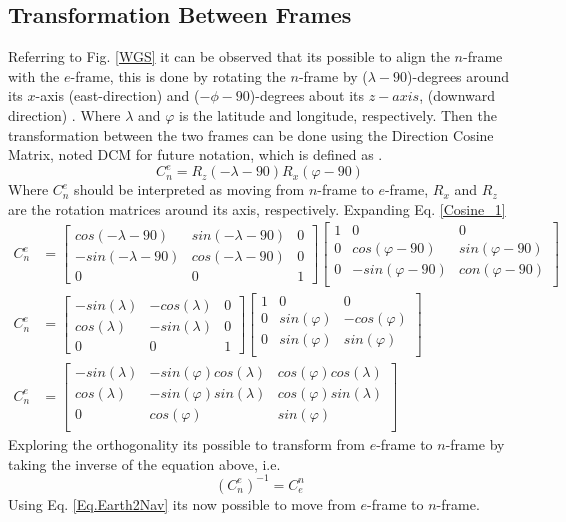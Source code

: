 \subsection*{Transformation Between Frames}
Referring to Fig. \ref{WGS} it can be observed that its possible to align the $n$-frame with the $e$-frame, this is done by rotating the $n$-frame by ($\lambda-90$)-degrees around its $x$-axis (east-direction) and ($-\phi-90$)-degrees about its $z-axis$, (downward direction) \cite{nonlinear}. Where $\lambda$ and $\varphi$ is the latitude and longitude, respectively. Then the transformation between the two frames can be done using the Direction Cosine Matrix, noted DCM for future notation, which is defined as \cite{nonlinear}.
\begin{equation}
C_n^e=R_z(-\lambda-90)R_x(\varphi-90)
\label{Cosine_1}
\end{equation}
Where $C_n^e$ should be interpreted as moving from $n$-frame to $e$-frame, $R_x$ and $R_z$ are the rotation matrices around its axis, respectively. Expanding Eq. \eqref{Cosine_1} 
\begin{align}
C_n^e &=
\begin{bmatrix}
cos(-\lambda-90) & sin(-\lambda-90) & 0\\
-sin(-\lambda-90) & cos(-\lambda-90) & 0\\
0 & 0 & 1
\end{bmatrix}
\begin{bmatrix}
1 & 0 & 0\\
0 & cos(\varphi-90) & sin(\varphi-90) \\
0 & -sin(\varphi-90) & con(\varphi-90) \\
\end{bmatrix}\\
C_n^e &=
\begin{bmatrix}
-sin(\lambda) & -cos(\lambda) & 0\\
cos(\lambda) & -sin(\lambda) & 0\\
0 & 0 & 1
\end{bmatrix}
\begin{bmatrix}
1 & 0 & 0\\
0 & sin(\varphi) & -cos(\varphi) \\
0 & sin(\varphi) & sin(\varphi) \\
\end{bmatrix}\\
C_n^e &=
\begin{bmatrix}
-sin(\lambda) & -sin(\varphi)cos(\lambda) & cos(\varphi)cos(\lambda) \\
cos(\lambda) & -sin(\varphi)sin(\lambda) &  cos(\varphi)sin(\lambda) \\
0 & cos(\varphi) & sin(\varphi) \\
\end{bmatrix}
\end{align}
Exploring the orthogonality its possible to transform from $e$-frame to $n$-frame by taking the inverse of the equation above, i.e.
\begin{equation}
(C_n^e)^{-1}=C_e^n
\label{Eq.Earth2Nav}
\end{equation}
Using Eq. \eqref{Eq.Earth2Nav} its now possible to move from $e$-frame to $n$-frame. 


